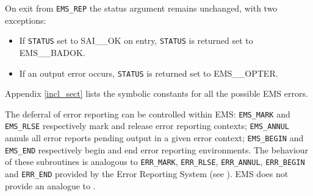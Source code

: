 \documentclass[twoside,11pt]{starlink}
\begin{document}
On exit from \texttt{EMS\_REP} the status argument remains unchanged, with
two exceptions:
\begin {itemize}
\item If \texttt{STATUS} set to SAI\_\_OK on entry,
\texttt{STATUS} is returned set to EMS\_\_BADOK.
\item If an output error occurs, \texttt{STATUS} is returned set to EMS\_\_OPTER.
\end {itemize}
Appendix \ref{incl_sect} lists the symbolic constants for all the possible
EMS errors.

The deferral of error reporting can be controlled within EMS:
\texttt{EMS\_MARK} and \texttt{EMS\_RLSE} respectively mark and release error
reporting contexts;
\texttt{EMS\_ANNUL} annuls all error reports pending output in a given error
context;
\texttt{EMS\_BEGIN} and \texttt{EMS\_END} respectively begin and end error
reporting environments.
The behaviour of these subroutines is analogous to \texttt{ERR\_MARK},
\texttt{ERR\_RLSE}, \texttt{ERR\_ANNUL}, \texttt{ERR\_BEGIN} and
\texttt{ERR\_END} provided by the Error Reporting System (see
).
EMS does not provide an analogue to
.
\end{document}
